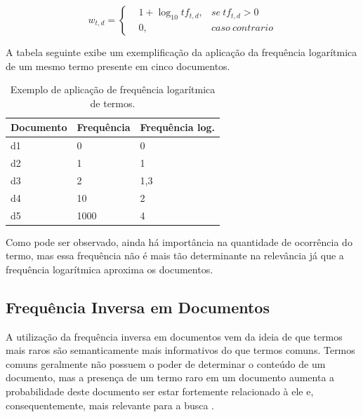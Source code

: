 \begin{equation}
w_{t,d} = 
\left\{\begin{matrix}
 &1 +  \log_{10}tf_{t,d},  &se\ tf_{t,d} > 0 \\ 
 &0,  &caso\ contrario 
\end{matrix}\right.
\label{eq:log-tf}
\end{equation}

A tabela seguinte exibe um exemplificação da aplicação da frequência logarítmica de um mesmo termo presente em cinco documentos.

\begin{table}[H]
	\centering
	\caption{Exemplo de aplicação de frequência logarítmica de termos.}
	\label{tab:log-tf-table}
	\def\arraystretch{1.2} %
	\begin{tabular}{|m{3cm} | m{3cm} | m{3cm} |}

		\hline
		
		\multicolumn{1}{|c|}{\bfseries Documento } & \multicolumn{1}{c|}{\bfseries Frequência} & \multicolumn{1}{c|}{\bfseries Frequência log.}\\ \hline
		d1   					&	0		&	0 	\\ \hline
		d2   					&	1		&	1 	\\ \hline
		d3   					&	2		&	1,3 \\ \hline
		d4   					&	10		&	2	\\ \hline
		d5   					&	1000	&	4 	\\ \hline
		
	\end{tabular}
\end{table}

Como pode ser observado, ainda há importância na quantidade de ocorrência do termo, mas essa frequência não é mais tão determinante na relevância já que a frequência logarítmica aproxima os documentos.

\subsection{Frequência Inversa em Documentos}

 A utilização da frequência inversa em documentos vem da ideia de que termos mais raros são semanticamente mais informativos do que termos comuns. Termos comuns geralmente não possuem o poder de determinar o conteúdo de um documento, mas a presença de um termo raro em um documento aumenta a probabilidade deste documento ser estar fortemente relacionado à ele e, consequentemente, mais relevante para a busca \citep{Manning2008}.

